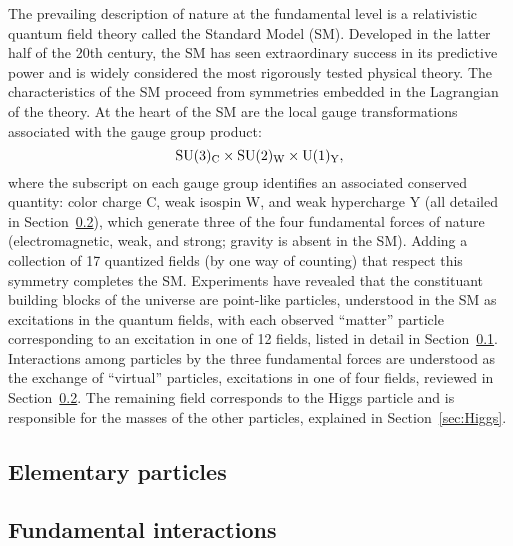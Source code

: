 The prevailing description of nature at the fundamental level is a relativistic quantum field theory called the Standard Model (SM). Developed in the latter half of the 20th century, the SM has seen extraordinary success in its predictive power and is widely considered the most rigorously tested physical theory. The characteristics of the SM proceed from symmetries embedded in the Lagrangian of the theory. At the heart of the SM are the local gauge transformations associated with the gauge group product: 
\begin{equation}
    \mathrm{SU(3)_{C}} \times \mathrm{SU(2)_{W}} \times \mathrm{U(1)_{Y}},
\end{equation}
where the subscript on each gauge group identifies an associated conserved quantity: color charge C, weak isospin W, and weak hypercharge Y (all detailed in Section~\ref{sec:Forces}), which generate three of the four fundamental forces of nature (electromagnetic, weak, and strong; gravity is absent in the SM). Adding a collection of 17 quantized fields (by one way of counting) that respect this symmetry completes the SM. Experiments have revealed that the constituant building blocks of the universe are point-like particles, understood in the SM as excitations in the quantum fields, with each observed ``matter'' particle corresponding to an excitation in one of 12 fields, listed in detail in Section~\ref{sec:Particles}. Interactions among particles by the three fundamental forces are understood as the exchange of ``virtual'' particles, excitations in one of four fields, reviewed in Section~\ref{sec:Forces}. The remaining field corresponds to the Higgs particle and is responsible for the masses of the other particles, explained in Section~\ref{sec:Higgs}. 

\subsection{Elementary particles} \label{sec:Particles}


\subsection{Fundamental interactions} \label{sec:Forces}
